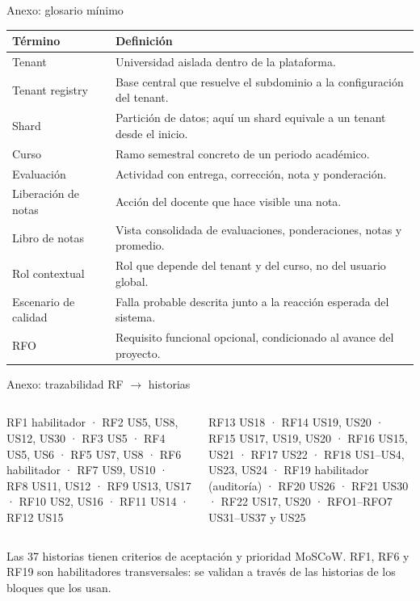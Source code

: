 \documentclass[aspectratio=169,10pt]{beamer}
\begin{document}
\begin{frame}{Anexo: glosario mínimo}
\small
\begin{tabularx}{\textwidth}{lY}
\toprule
\textbf{Término} & \textbf{Definición} \\
\midrule
Tenant & Universidad aislada dentro de la plataforma. \\
Tenant registry & Base central que resuelve el subdominio a la configuración del tenant. \\
Shard & Partición de datos; aquí un shard equivale a un tenant desde el inicio. \\
Curso & Ramo semestral concreto de un periodo académico. \\
Evaluación & Actividad con entrega, corrección, nota y ponderación. \\
Liberación de notas & Acción del docente que hace visible una nota. \\
Libro de notas & Vista consolidada de evaluaciones, ponderaciones, notas y promedio. \\
Rol contextual & Rol que depende del tenant y del curso, no del usuario global. \\
Escenario de calidad & Falla probable descrita junto a la reacción esperada del sistema. \\
RFO & Requisito funcional opcional, condicionado al avance del proyecto. \\
\bottomrule
\end{tabularx}
\end{frame}

\begin{frame}{Anexo: trazabilidad RF $\rightarrow$ historias}
\small
\begin{columns}[T,onlytextwidth]
\begin{column}{0.49\textwidth}
RF1 habilitador · RF2 US5, US8, US12, US30 · RF3 US5 · RF4 US5, US6 · RF5 US7, US8 · RF6 habilitador · RF7 US9, US10 · RF8 US11, US12 · RF9 US13, US17 · RF10 US2, US16 · RF11 US14 · RF12 US15
\end{column}
\begin{column}{0.49\textwidth}
RF13 US18 · RF14 US19, US20 · RF15 US17, US19, US20 · RF16 US15, US21 · RF17 US22 · RF18 US1--US4, US23, US24 · RF19 habilitador (auditoría) · RF20 US26 · RF21 US30 · RF22 US17, US20 · RFO1--RFO7 US31--US37 y US25
\end{column}
\end{columns}
\vspace{0.3cm}
{\footnotesize Las 37 historias tienen criterios de aceptación y prioridad MoSCoW. RF1, RF6 y RF19 son habilitadores transversales: se validan a través de las historias de los bloques que los usan.}
\end{frame}
\end{document}
